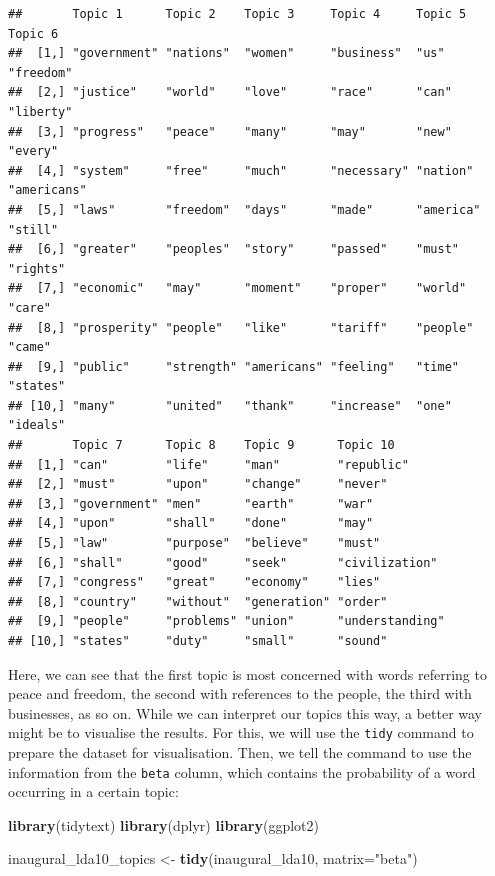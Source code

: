 \documentclass[
]{book}
\newenvironment{Shaded}{\begin{snugshade}}{\end{snugshade}}
\newcommand{\AttributeTok}[1]{\textcolor[rgb]{0.13,0.29,0.53}{#1}}
\newcommand{\FunctionTok}[1]{\textcolor[rgb]{0.13,0.29,0.53}{\textbf{#1}}}
\newcommand{\NormalTok}[1]{#1}
\newcommand{\OtherTok}[1]{\textcolor[rgb]{0.56,0.35,0.01}{#1}}
\newcommand{\StringTok}[1]{\textcolor[rgb]{0.31,0.60,0.02}{#1}}
\begin{document}
\begin{verbatim}
##       Topic 1      Topic 2    Topic 3     Topic 4     Topic 5   Topic 6    
##  [1,] "government" "nations"  "women"     "business"  "us"      "freedom"  
##  [2,] "justice"    "world"    "love"      "race"      "can"     "liberty"  
##  [3,] "progress"   "peace"    "many"      "may"       "new"     "every"    
##  [4,] "system"     "free"     "much"      "necessary" "nation"  "americans"
##  [5,] "laws"       "freedom"  "days"      "made"      "america" "still"    
##  [6,] "greater"    "peoples"  "story"     "passed"    "must"    "rights"   
##  [7,] "economic"   "may"      "moment"    "proper"    "world"   "care"     
##  [8,] "prosperity" "people"   "like"      "tariff"    "people"  "came"     
##  [9,] "public"     "strength" "americans" "feeling"   "time"    "states"   
## [10,] "many"       "united"   "thank"     "increase"  "one"     "ideals"   
##       Topic 7      Topic 8    Topic 9      Topic 10       
##  [1,] "can"        "life"     "man"        "republic"     
##  [2,] "must"       "upon"     "change"     "never"        
##  [3,] "government" "men"      "earth"      "war"          
##  [4,] "upon"       "shall"    "done"       "may"          
##  [5,] "law"        "purpose"  "believe"    "must"         
##  [6,] "shall"      "good"     "seek"       "civilization" 
##  [7,] "congress"   "great"    "economy"    "lies"         
##  [8,] "country"    "without"  "generation" "order"        
##  [9,] "people"     "problems" "union"      "understanding"
## [10,] "states"     "duty"     "small"      "sound"
\end{verbatim}

Here, we can see that the first topic is most concerned with words referring to peace and freedom, the second with references to the people, the third with businesses, as so on. While we can interpret our topics this way, a better way might be to visualise the results. For this, we will use the \texttt{tidy} command to prepare the dataset for visualisation. Then, we tell the command to use the information from the \texttt{beta} column, which contains the probability of a word occurring in a certain topic:

\begin{Shaded}
\begin{Highlighting}[]
\FunctionTok{library}\NormalTok{(tidytext)}
\FunctionTok{library}\NormalTok{(dplyr)}
\FunctionTok{library}\NormalTok{(ggplot2)}

\NormalTok{inaugural\_lda10\_topics }\OtherTok{\textless{}{-}} \FunctionTok{tidy}\NormalTok{(inaugural\_lda10, }\AttributeTok{matrix=}\StringTok{"beta"}\NormalTok{)}
\end{Highlighting}
\end{Shaded}
\end{document}

